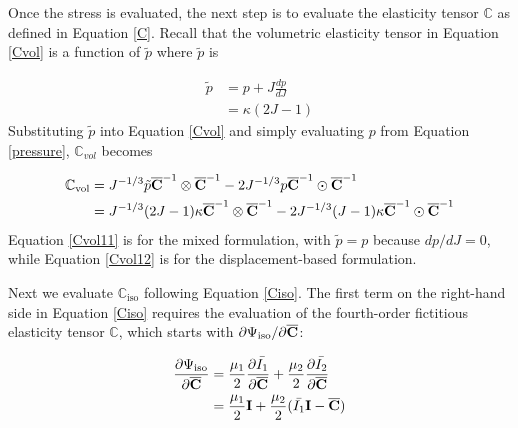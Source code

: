 Once the stress is evaluated, the next step is to evaluate the elasticity tensor $\mathbb{C}$ as defined in Equation \ref{C}. Recall that the volumetric elasticity tensor in Equation \ref{Cvol} is a function of $\tilde{p}$ where $\tilde{p}$ is

\begin{equation}
\begin{split}
\tilde{p} &= p + J\frac{dp}{dJ} \\
             &= \kappa{(2J - 1)}
\end{split}
\end{equation}
Substituting $\tilde{p}$ into Equation \ref{Cvol} and simply evaluating $p$ from Equation \ref{pressure}, $\mathbb{C}_{vol}$ becomes

\begin{subequations} \label{Cvol1}
\begin{align}
\mathbb{C}_\mathrm{vol} &= J^{-1/3}\tilde{p}{\overline{\bold{C}}}^{-1}\otimes{\overline{\bold{C}}}^{-1} - 2J^{-1/3}p{\overline{\bold{C}}}^{-1}\odot{\overline{\bold{C}}}^{-1} \label{Cvol11} \\
&=  J^{-1/3}(2J-1)\kappa \overline{\bold{C}}^{-1} \otimes \overline{\bold{C}}^{-1} - 2J^{-1/3}(J-1)\kappa \overline{\bold{C}}^{-1} \odot \overline{\bold{C}}^{-1} \label{Cvol12}
\end{align}
\end{subequations} 
Equation \ref{Cvol11} is for the mixed formulation, with $\tilde{p} = p$ because $dp/dJ = 0$, while Equation \ref{Cvol12} is for the displacement-based formulation.

Next we evaluate $\mathbb{C}_\mathrm{iso}$ following Equation \ref{Ciso}. The first term on the right-hand side in Equation \ref{Ciso} requires the evaluation of the fourth-order fictitious elasticity tensor $\mathbb{C}$, which starts with ${\partial{\Psi_\mathrm{iso}}}/{\partial{\overline{\bold{C}}}}$:

\begin{equation}
\begin{split}
\frac{\partial{\Psi_\mathrm{iso}}}{\partial{\overline{\bold{C}}}} &= \frac{\mu_1}{2}\frac{\partial{\bar{I_1}}}{\partial{\overline{\bold{C}}}} +  \frac{\mu_2}{2}\frac{\partial{\bar{I_2}}}{\partial{\overline{\bold{C}}}} \\
&= \frac{\mu_1}{2}\bold{I} + \frac{\mu_2}{2}(\bar{I_1}\bold{I} - \overline{\bold{C}})
\end{split}
\end{equation}

